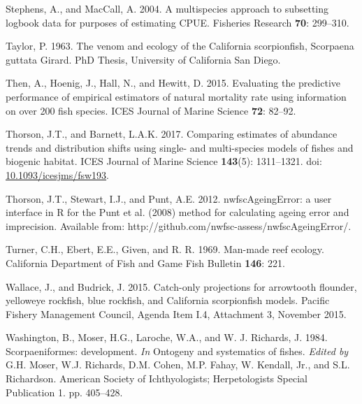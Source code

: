\documentclass[12pt,]{article}
\begin{document}
\hypertarget{ref-Stephens2004}{}
Stephens, A., and MacCall, A. 2004. A multispecies approach to
subsetting logbook data for purposes of estimating CPUE. Fisheries
Research \textbf{70}: 299--310.

\hypertarget{ref-Taylor1963}{}
Taylor, P. 1963. The venom and ecology of the California scorpionfish,
Scorpaena guttata Girard. PhD Thesis, University of California San
Diego.

\hypertarget{ref-Then2015}{}
Then, A., Hoenig, J., Hall, N., and Hewitt, D. 2015. Evaluating the
predictive performance of empirical estimators of natural mortality rate
using information on over 200 fish species. ICES Journal of Marine
Science \textbf{72}: 82--92.

\hypertarget{ref-Thorson2017}{}
Thorson, J.T., and Barnett, L.A.K. 2017. Comparing estimates of
abundance trends and distribution shifts using single- and multi-species
models of fishes and biogenic habitat. ICES Journal of Marine Science
\textbf{143}(5): 1311--1321. doi:
\href{https://doi.org/10.1093/icesjms/fsw193}{10.1093/icesjms/fsw193}.

\hypertarget{ref-Thorson2012}{}
Thorson, J.T., Stewart, I.J., and Punt, A.E. 2012. nwfscAgeingError: a
user interface in R for the Punt et al. (2008) method for calculating
ageing error and imprecision. Available from:
http://github.com/nwfsc-assess/nwfscAgeingError/.

\hypertarget{ref-Turner1969}{}
Turner, C.H., Ebert, E.E., Given, and R. R. 1969. Man-made reef ecology.
California Department of Fish and Game Fish Bulletin \textbf{146}: 221.

\hypertarget{ref-Wallace2015}{}
Wallace, J., and Budrick, J. 2015. Catch-only projections for arrowtooth
flounder, yelloweye rockfish, blue rockfish, and California scorpionfish
models. Pacific Fishery Management Council, Agenda Item I.4, Attachment
3, November 2015.

\hypertarget{ref-Washington1984}{}
Washington, B., Moser, H.G., Laroche, W.A., and W. J. Richards, J. 1984.
Scorpaeniformes: development. \emph{In} Ontogeny and systematics of
fishes. \emph{Edited by} G.H. Moser, W.J. Richards, D.M. Cohen, M.P.
Fahay, W. Kendall, Jr., and S.L. Richardson. American Society of
Ichthyologists; Herpetologists Special Publication 1. pp. 405--428.
\end{document}

